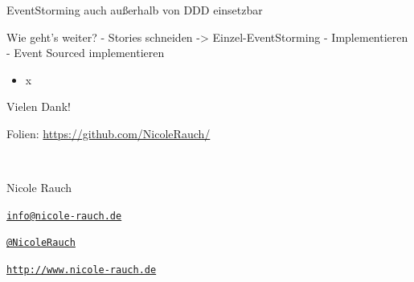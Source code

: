 EventStorming auch außerhalb von DDD einsetzbar



Wie geht's weiter?
- Stories schneiden -> Einzel-EventStorming
- Implementieren
- Event Sourced implementieren


\begin{frame}[fragile]{}

\begin{itemize}
\item x
\end{itemize}

\end{frame}

\begin{frame}[fragile]{}

\begin{center}
{
\LARGE
}
\end{center}

\end{frame}

\begin{frame}[fragile]{}

\begin{center}
\end{center}

\end{frame}


\begin{frame}{Vielen Dank!}

        Folien: \url{https://github.com/NicoleRauch/} 
        
        ~\\[1em]
        \begin{block}{Nicole Rauch}
        \begin{description}[Twitterxx]
                \item[E-Mail]  \href{mailto:info@nicole-rauch.de}{\texttt{info@nicole-rauch.de}}
                \item[Twitter] \href{http://twitter.com/NicoleRauch}{\texttt{@NicoleRauch}}
                \item[Web] \href{http://www.nicole-rauch.de}{\texttt{http://www.nicole-rauch.de}}
        \end{description}
        \end{block}
\end{frame}


